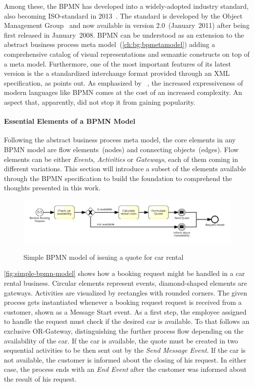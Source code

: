 Among these, the \acs{BPMN} has developed into a widely-adopted industry standard, also becoming ISO-standard in 2013~\cite{iso2013bpmn}.
The standard is developed by the Object Management Group~\cite{omghome} and now available in version 2.0~(January~2011) after being first released in January~2008.
\acs{BPMN} can be understood as an extension to the abstract business process meta model~(\autoref{ch:bg:bpmetamodel}) adding a comprehensive catalog of visual representations and semantic constructs on top of a meta model. Furthermore, one of the most important features of its latest version is the a standardized interchange format provided through an \acs{XML} specification, as \cite{weske:bpm-book} points out.
As emphasized by \citeauthor{Muehlen:2007}~\cite{Muehlen:2007}, the increased expressiveness of modern languages like \acs{BPMN} comes at the cost of an increased complexity. An aspect that, apparently, did not stop it from gaining popularity.

\paragraph{Essential Elements of a BPMN Model}
Following the abstract business process meta model, the core elements in any BPMN model are flow elements~(nodes) and connecting objects~(edges).
Flow elements can be either \textit{Events}, \textit{Activities} or \textit{Gateways}, each of them coming in different variations.
This section will introduce a subset of the elements available through the \acs{BPMN} specification to build the foundation to comprehend the thoughts presented in this work.

\begin{figure}[]
	\myfloatalign
	{\includegraphics[width=1\linewidth]{chapters/background/intro-rental-car.png}}
	\caption{Simple BPMN model of issuing a quote for car rental}
	\label{fig:simple-bpmn-model}
\end{figure}

\autoref{fig:simple-bpmn-model} shows how a booking request might be handled in a car rental business.
Circular elements represent events, diamond-shaped elements are gateways. Activities are visualized by rectangles with rounded corners.
The given process gets instantiated whenever a booking request request is received from a customer, shown as a Message Start event. 
As a first step, the employee assigned to handle the request must check if the desired car is available. To that follows an exclusive OR-Gateway, distinguishing the further process flow depending on the availability of the car.
If the car is available, the quote must be created in two sequential activities to be then sent out by the \textit{Send Message Event}. If the car is not available, the customer is informed about the closing of his request. 
In either case, the process ends with an \textit{End Event} after the customer was informed about the result of his request.

